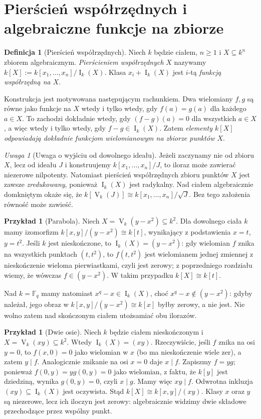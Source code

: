 \documentclass[11pt,a4paper,openany]{report}
\numberwithin{equation}{section}
\theoremstyle{plain}
\theoremstyle{definition}
\newtheorem{definicja}[twierdzenie]{Definicja}
\newtheorem{przyklad}[twierdzenie]{Przykład}
\theoremstyle{remark}
\newtheorem{uwaga}[twierdzenie]{Uwaga}
\newcommand{\F}{\mathbb F}
\newcommand{\V}{\operatorname V}
\newcommand{\I}{\operatorname I}
\begin{document}
\section{Pierścień współrzędnych i algebraiczne funkcje na zbiorze}

\begin{definicja}[Pierścień współrzędnych]
Niech $k$ będzie ciałem, $n\ge1$ i $X\subseteq k^n$ zbiorem
algebraicznym. \emph{Pierścieniem współrzędnych} $X$ nazywamy
$k[X]:=k[x_1,\dots,x_n]/\I_k(X)$.
Klasa $x_i+\I_k(X)$ jest $i$-tą \emph{funkcją współrzędną na $X$}.
\end{definicja}

Konstrukcja jest motywowana następującym rachunkiem. Dwa wielomiany
$f,g$ są równe jako funkcje na $X$ wtedy i tylko wtedy, gdy
$f(a)=g(a)$ dla każdego $a\in X$. To zachodzi dokładnie wtedy,
gdy $(f-g)(a)=0$ dla wszystkich $a\in X$, a więc wtedy i tylko wtedy,
gdy $f-g\in\I_k(X)$. Zatem \emph{elementy $k[X]$ odpowiadają dokładnie
funkcjom wielomianowym na zbiorze punktów $X$}.

\begin{uwaga}[Uwaga o wyjściu od dowolnego ideału]
Jeżeli zaczynamy nie od zbioru $X$, lecz od ideału $J$ i konstruujemy
$k[x_1,\dots,x_n]/J$, to iloraz może zawierać niezerowe nilpotenty.
Natomiast pierścień współrzędnych zbioru punktów $X$ jest zawsze
\emph{zredukowany}, ponieważ $\I_k(X)$ jest radykalny.
Nad ciałem algebraicznie domkniętym okaże się, że
$k[\V_k(J)]\cong k[x_1,\dots,x_n]/\sqrt J$.
Bez tego założenia równość może zawieść.
\end{uwaga}

\begin{przyklad}[Parabola]
Niech $X=\V_k(y-x^2)\subseteq k^2$.
Dla dowolnego ciała $k$ mamy izomorfizm
$k[x,y]/(y-x^2)\cong k[t]$, wynikający z podstawienia
$x=t$, $y=t^2$. Jeśli $k$ jest nieskończone, to
$\I_k(X)=(y-x^2)$: gdy wielomian $f$ znika na wszystkich
punktach $(t,t^2)$, to $f(t,t^2)$ jest wielomianem jednej
zmiennej z nieskończenie wieloma pierwiastkami, czyli jest zerowy;
z poprzedniego rozdziału wiemy, że wówczas $f\in(y-x^2)$.
W takim przypadku $k[X]\cong k[t]$.

Nad $k=\F_q$ mamy natomiast $x^q-x\in\I_k(X)$,
choć $x^q-x\notin(y-x^2)$: gdyby należał, jego obraz w
$k[x,y]/(y-x^2)\cong k[x]$ byłby zerowy, a nie jest.
Nie wolno zatem nad skończonym ciałem utożsamiać obu ilorazów.
\end{przyklad}

\begin{przyklad}[Dwie osie]
Niech $k$ będzie ciałem nieskończonym i
$X=\V_k(xy)\subseteq k^2$. Wtedy $\I_k(X)=(xy)$.
Rzeczywiście, jeśli $f$ znika na osi $y=0$, to
$f(x,0)=0$ jako wielomian w $x$ (bo ma nieskończenie wiele zer),
a zatem $y\mid f$. Analogicznie znikanie na osi $x=0$
daje $x\mid f$. Zapiszmy $f=yg$; ponieważ $f(0,y)=yg(0,y)=0$
jako wielomian, z faktu, że $k[y]$ jest dziedziną, wynika
$g(0,y)=0$, czyli $x\mid g$. Mamy więc $xy\mid f$.
Odwrotna inkluzja $(xy)\subseteq\I_k(X)$ jest oczywista.
Stąd $k[X]\cong k[x,y]/(xy)$. Klasy $x$ oraz $y$
są niezerowe, lecz ich iloczyn jest zerowy: algebraicznie
widzimy dwie składowe przechodzące przez wspólny punkt.
\end{przyklad}
\end{document}

